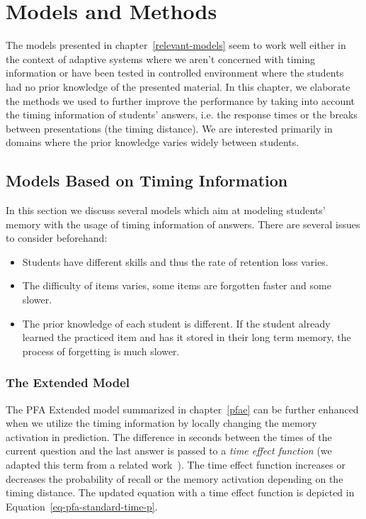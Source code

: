\chapter{Models and Methods}

The models presented in chapter~\ref{relevant-models} seem to work well either in the context of adaptive systems where we aren't concerned with timing information or have been tested in controlled environment where the students had no prior knowledge of the presented material. In this chapter, we elaborate the methods we used to further improve the performance by taking into account the timing information of students' answers, i.e. the response times or the breaks between presentations (the timing distance). We are interested primarily in domains where the prior knowledge varies widely between students.

\section{Models Based on Timing Information}

In this section we discuss several models which aim at modeling students' memory with the usage of timing information of answers. There are several issues to consider beforehand:

\begin{itemize}
  \item Students have different skills and thus the rate of retention loss varies.
  \item The difficulty of items varies, some items are forgotten faster and some slower.
  \item The prior knowledge of each student is different. If the student already learned the practiced item and has it stored in their long term memory, the process of forgetting is much slower.
\end{itemize}

\subsection{The Extended Model}
\label{pfaet}

The PFA Extended model summarized in chapter~\ref{pfae} can be further enhanced when we utilize the timing information by locally changing the memory activation in prediction. The difference in seconds between the times of the current question and the last answer is passed to a \textit{time effect function} (we adapted this term from a related work~\cite{Pelanek2015}). The time effect function increases or decreases the probability of recall or the memory activation depending on the timing distance. The updated equation with a time effect function is depicted in Equation~\ref{eq-pfa-standard-time-p}.

